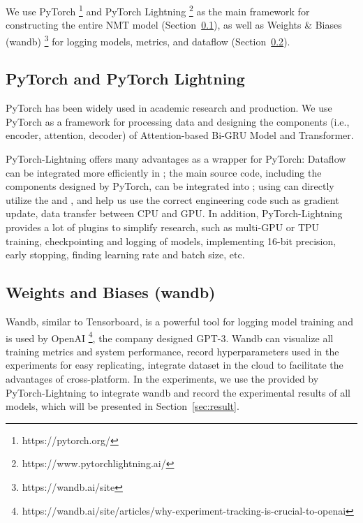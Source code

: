 We use PyTorch \footnote{https://pytorch.org/} and PyTorch Lightning \footnote{https://www.pytorchlightning.ai/} \cite{falcon2019pytorch}  as the main framework for constructing the entire NMT model (Section~\ref{sec:lightning}), as well as Weights \& Biases (wandb) \footnote{https://wandb.ai/site} \cite{wandb} for logging models, metrics, and dataflow (Section~\ref{sec:wandb}).

\subsection{PyTorch and PyTorch Lightning} \label{sec:lightning}

PyTorch has been widely used in academic research and production. We use PyTorch as a framework for processing data and designing the components (i.e., encoder, attention, decoder) of Attention-based Bi-GRU Model and Transformer.

PyTorch-Lightning offers many advantages as a wrapper for PyTorch: Dataflow can be integrated more efficiently in ; the main source code, including the components designed by PyTorch, can be integrated into ; using  can directly utilize the  and , and help us use the correct engineering code such as gradient update, data transfer between CPU and GPU. In addition, PyTorch-Lightning provides a lot of plugins to simplify research, such as multi-GPU or TPU training, checkpointing and logging of models, implementing 16-bit precision, early stopping, finding learning rate and batch size, etc.

\subsection{Weights and Biases (wandb)} \label{sec:wandb}

Wandb, similar to Tensorboard, is a powerful tool for logging model training and is used by OpenAI \footnote{https://wandb.ai/site/articles/why-experiment-tracking-is-crucial-to-openai}, the company designed GPT-3. Wandb can visualize all training metrics and system performance, record hyperparameters used in the experiments for easy replicating, integrate dataset in the cloud to facilitate the advantages of cross-platform. In the experiments, we use the  provided by PyTorch-Lightning to integrate wandb and record the experimental results of all models, which will be presented in Section~\ref{sec:result}.

